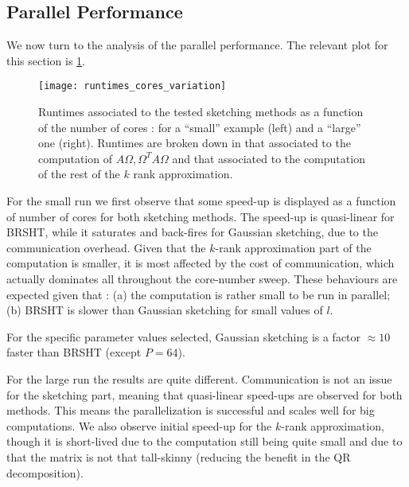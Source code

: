 \documentclass[a4paper, 12pt,oneside]{article}
\begin{document}
        \subsection{Parallel Performance}
			We now turn to the analysis of the parallel performance. The relevant plot for this section is \ref{fig:runtimes-cores-variation}. 
			\begin{figure}[htbp]       
				\centering             
					\vspace{0em}
					\texttt{[image: runtimes\_cores\_variation]}
					\caption{Runtimes associated to the tested sketching methods as a function of the number of cores : for a ``small'' example (left) and a ``large'' one (right). Runtimes are broken down in that associated to the computation of $A\Omega,\Omega^T A\Omega$ and that associated to the computation of the rest of the $k$ rank approximation.}
					\label{fig:runtimes-cores-variation}
			\end{figure}
			For the small run we first observe that some speed-up is displayed as a function of number of cores for both sketching methods. The speed-up is quasi-linear for BRSHT, while it saturates and back-fires for Gaussian sketching, due to the communication overhead. Given that the $k$-rank approximation part of the computation is smaller, it is most affected by the cost of communication, which actually dominates all throughout the core-number sweep.   
			These behaviours are expected given that : (a) the computation is rather small to be run in parallel; (b) BRSHT is slower than Gaussian sketching for small values of $l$. 
			
			For the specific parameter values selected, Gaussian sketching is a factor $\approx 10$ faster than BRSHT (except $P=64$).
			
			For the large run the results are quite different. Communication is not an issue for the sketching part, meaning that quasi-linear speed-ups are observed for both methods. 
			This means the parallelization is successful and scales well for big computations. 
			We also observe initial speed-up for the $k$-rank approximation, though it is short-lived due to the computation still being quite small and due to that the matrix is not that tall-skinny 
			(reducing the benefit in the QR decomposition).
\end{document}
